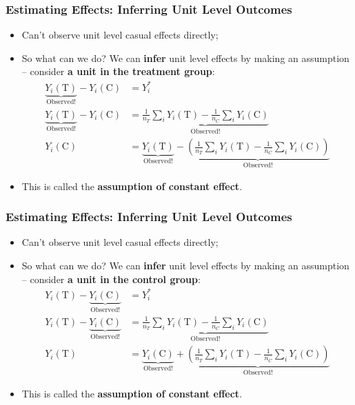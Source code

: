 \documentclass[aspectratio=169]{beamer}
\theoremstyle{principle}
\begin{document}
\begin{frame}
\frametitle{Estimating Effects: Inferring Unit Level Outcomes}
\begin{itemize}
\item Can't observe unit level casual effects directly;
\bigskip
\item So what can we do?  We can \textbf{infer} unit level effects by making an assumption -- consider \textbf{a unit in the treatment group}:
\begin{align*}
\underbrace{Y_i(\mbox{T})}_{\mbox{Observed!}} - Y_i(\mbox{C}) &= Y_i^*\\
\underbrace{Y_i(\mbox{T})}_{\mbox{Observed!}} - Y_i(\mbox{C}) &= \underbrace{\frac{1}{n_T}\sum_iY_i(\mbox{T}) - \frac{1}{n_C}\sum_iY_i(\mbox{C})}_{\mbox{Observed!}}\\
Y_i(\mbox{C}) &= \underbrace{Y_i(\mbox{T})}_{\mbox{Observed!}} - \underbrace{\left(\frac{1}{n_T}\sum_iY_i(\mbox{T}) - \frac{1}{n_C}\sum_iY_i(\mbox{C})\right)}_{\mbox{Observed!}}
\end{align*}
\item This is called the \textbf{assumption of constant effect}.
\end{itemize}
\end{frame}

\begin{frame}
\frametitle{Estimating Effects: Inferring Unit Level Outcomes}
\begin{itemize}
\item Can't observe unit level casual effects directly;
\bigskip
\item So what can we do?  We can \textbf{infer} unit level effects by making an assumption -- consider \textbf{a unit in the control group}:
\begin{align*}
Y_i(\mbox{T}) - \underbrace{Y_i(\mbox{C})}_{\mbox{Observed!}} &= Y_i^*\\
Y_i(\mbox{T}) - \underbrace{Y_i(\mbox{C})}_{\mbox{Observed!}} &= \underbrace{\frac{1}{n_T}\sum_iY_i(\mbox{T}) - \frac{1}{n_C}\sum_iY_i(\mbox{C})}_{\mbox{Observed!}}\\
Y_i(\mbox{T}) &= \underbrace{Y_i(\mbox{C})}_{\mbox{Observed!}} + \underbrace{\left(\frac{1}{n_T}\sum_iY_i(\mbox{T}) - \frac{1}{n_C}\sum_iY_i(\mbox{C})\right)}_{\mbox{Observed!}}
\end{align*}
\item This is called the \textbf{assumption of constant effect}.
\end{itemize}
\end{frame}
\end{document}
